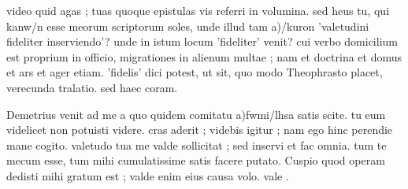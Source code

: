 


 video quid agas ; tuas quoque epistulas vis referri in volumina. sed heus tu, qui kanw/n esse meorum scriptorum soles, unde illud tam a)/kuron 'valetudini fideliter inserviendo'? unde in istum locum 'fideliter' venit? cui verbo domicilium est proprium in officio, migrationes in alienum multae ; nam et doctrina et domus et ars et ager etiam. 'fidelis' dici potest, ut sit, quo modo Theophrasto placet, verecunda tralatio. sed haec coram.

 Demetrius venit ad me a quo quidem comitatu a)fwmi/lhsa satis scite. tu eum videlicet non potuisti videre. cras aderit ; videbis igitur ; nam ego hinc perendie mane cogito. valetudo tua me valde sollicitat ; sed inservi et fac omnia. tum te mecum esse, tum mihi cumulatissime satis facere putato. Cuspio quod operam dedisti mihi gratum est ; valde enim eius causa volo. vale .
